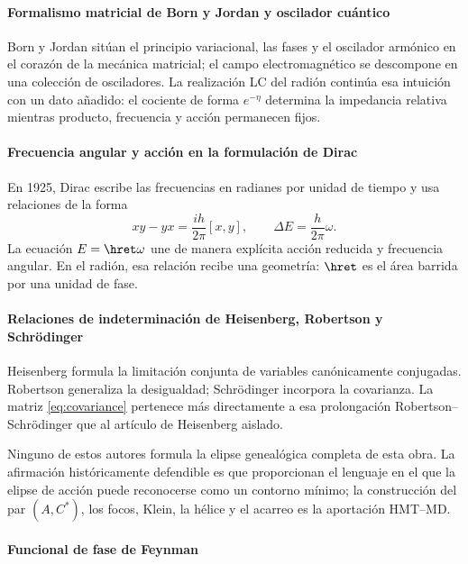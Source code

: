 \paragraph{Formalismo matricial de Born y Jordan y oscilador cuántico}

Born y Jordan sitúan el principio variacional, las fases y el oscilador
armónico en el corazón de la mecánica matricial; el campo electromagnético se
descompone en una colección de osciladores. La realización LC del radión
continúa esa intuición con un dato añadido: el cociente de forma
\(e^{-\eta}\) determina la impedancia relativa mientras producto, frecuencia
y acción permanecen fijos.

\paragraph{Frecuencia angular y acción en la formulación de Dirac}

En 1925, Dirac escribe las frecuencias en radianes por unidad de tiempo y usa
relaciones de la forma
\[
xy-yx=\frac{ih}{2\pi}[x,y],
\qquad
\Delta E=\frac{h}{2\pi}\omega.
\]
La ecuación \(E=\hret\omega\) une de manera explícita acción reducida y
frecuencia angular. En el radión, esa relación recibe una geometría: \(\hret\)
es el área barrida por una unidad de fase.

\paragraph{Relaciones de indeterminación de Heisenberg, Robertson y Schrödinger}

Heisenberg formula la limitación conjunta de variables canónicamente
conjugadas. Robertson generaliza la desigualdad; Schrödinger incorpora la
covarianza. La matriz \eqref{eq:covariance} pertenece más directamente a esa
prolongación Robertson--Schrödinger que al artículo de Heisenberg aislado.

Ninguno de estos autores formula la elipse genealógica completa de esta obra.
La afirmación históricamente defendible es que proporcionan el lenguaje en el
que la elipse de acción puede reconocerse como un contorno mínimo; la
construcción del par \((A,C^*)\), los focos, Klein, la hélice y el acarreo es la
aportación HMT--MD.

\paragraph{Funcional de fase de Feynman}

